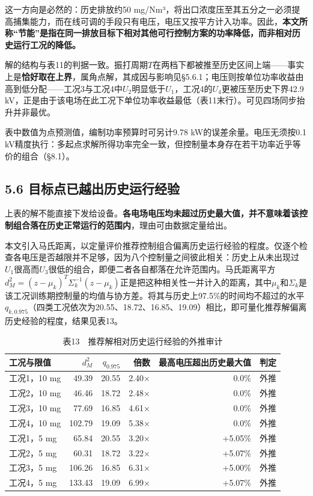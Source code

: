 \documentclass[UTF8,zihao=5,a4paper]{ctexart}
\begin{document}
这一方向是必然的：历史排放约50 mg/Nm³，将出口浓度压至其五分之一必须提高捕集能力，而在线可调的手段只有电压，电压又按平方计入功率。因此，\textbf{本文所称“节能”是指在同一排放目标下相对其他可行控制方案的功率降低，而非相对历史运行工况的降低。}

解的结构与表11的判据一致。振打周期$T$在两档下都被推至历史区间上端——事实上是\textbf{恰好取在上界}，属角点解，其成因与影响见§5.6.1；电压则按单位功率收益由高到低分配——工况3与工况4中$U_2$明显低于$U_1$，工况4的$U_4$更被压至历史下界42.9 kV，正是由于该电场在此工况下单位功率收益最低（表11末行）。可见四场同步抬升并非最优。

表中数值为点预测值，编制功率预算时可另计9.78 kW的误差余量。电压无须按0.1 kV精度执行：多起点求解所得功率完全一致，但控制量本身存在若干功率近乎等价的组合（§8.1）。

\subsection*{5.6 目标点已越出历史运行经验}

上表的解不能直接下发给设备。\textbf{各电场电压均未超过历史最大值，并不意味着该控制组合落在历史正常运行的范围内}，理由可由数据定量给出。

本文引入马氏距离，以定量评价推荐控制组合偏离历史运行经验的程度。仅逐个检查各电压是否越限并不足够，因为八个控制量之间彼此相关：历史上从未出现过$U_1$很高而$U_3$很低的组合，即便二者各自都落在允许范围内。马氏距离平方$d_M^2=(z-\mu_k)^T\Sigma_k^{-1}(z-\mu_k)$正是把这种相关性一并计入的距离，其中$\mu_k$和$\Sigma_k$是该工况训练期控制量的均值与协方差。将其与历史上97.5\%的时间均不超过的水平$q_{k,0.975}$（四类工况依次为20.55、18.72、16.85、19.09）相比，即可量化推荐解偏离历史经验的程度，结果见表13。


\begin{table}[htb]
\centering
\caption*{\normalsize 表13　推荐解相对历史运行经验的外推审计}
\vspace{-2pt}
\begin{tabular}{lrrrrc}
\toprule
工况与限值 & $d_M^2$ & $q_{0.975}$ & 倍数 & 最高电压超出历史最大值 & 判定 \\
\midrule
工况1，10 mg & 49.39 & 20.55 & 2.40× & 0.0\% & 外推 \\
工况2，10 mg & 46.46 & 18.72 & 2.48× & 0.0\% & 外推 \\
工况3，10 mg & 77.69 & 16.85 & 4.61× & 0.0\% & 外推 \\
工况4，10 mg & 102.79 & 19.09 & 5.38× & 0.0\% & 外推 \\
工况1，5 mg & 65.84 & 20.55 & 3.20× & +5.05\% & 外推 \\
工况2，5 mg & 60.31 & 18.72 & 3.22× & +5.07\% & 外推 \\
工况3，5 mg & 106.26 & 16.85 & 6.31× & +5.00\% & 外推 \\
工况4，5 mg & 133.43 & 19.09 & 6.99× & +5.07\% & 外推 \\
\bottomrule
\end{tabular}
\end{table}
\end{document}
